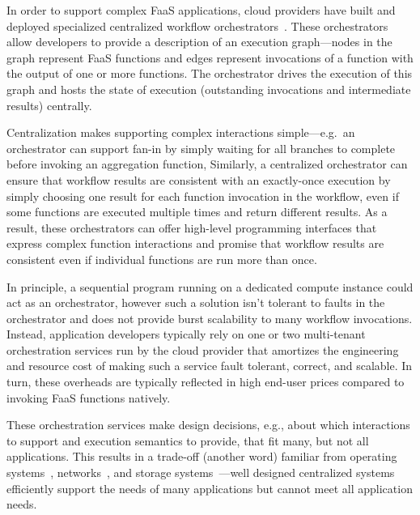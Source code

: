 In order to support complex FaaS applications, cloud providers have built and
deployed specialized centralized workflow
orchestrators~\cite{aws-step-functions, google-cloud-composer, google-workflows,
durable-functions}. These orchestrators allow developers to provide a
description of an execution graph---nodes in the graph represent FaaS functions
and edges represent invocations of a function with the output of one or more
functions. The orchestrator drives the execution of this graph and hosts the
state of execution (outstanding invocations and intermediate results) centrally.

Centralization makes supporting complex interactions simple---e.g.\ an
orchestrator can support fan-in by simply waiting for all branches to complete
before invoking an aggregation function, Similarly, a centralized orchestrator
can ensure that workflow results are consistent with an exactly-once execution
by simply choosing one result for each function invocation in the workflow, even
if some functions are executed multiple times and return different results. As a
result, these orchestrators can offer high-level programming interfaces that
express complex function interactions and promise that workflow results are
consistent even if individual functions are run more than once.

In principle, a sequential program running on a dedicated compute instance could
act as an orchestrator, however such a solution isn't tolerant to faults in the
orchestrator and does not provide burst scalability to many workflow
invocations. Instead, application developers typically rely on one or two
multi-tenant orchestration services run by the cloud provider that amortizes the
engineering and resource cost of making such a service fault tolerant, correct,
and scalable. In turn, these overheads are typically reflected in high end-user
prices compared to invoking FaaS functions natively.

These orchestration services make design decisions, e.g., about which interactions
to support and execution semantics to provide, that fit many, but not all
applications. This results in a trade-off (another word) familiar from operating
systems~\cite{exokernel,spin}, networks~\cite{active-networks,sdn}, and storage
systems~\cite{comet,rust-comet}---well designed centralized systems efficiently
support the needs of many applications but cannot meet all application needs.

